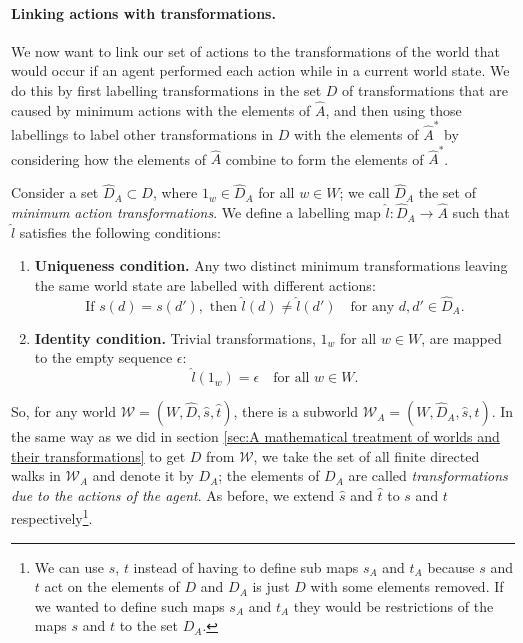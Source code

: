 \paragraph{Linking actions with transformations.}
We now want to link our set of actions to the transformations of the world that would occur if an agent performed each action while in a current world state.
We do this by first labelling transformations in the set $D$ of transformations that are caused by minimum actions with the elements of $\hat{A}$, and then using those labellings to label other transformations in $D$ with the elements of $\hat{A}^{\ast}$ by considering how the elements of $\hat{A}$ combine to form the elements of $\hat{A}^{\ast}$.

Consider a set $\hat{D}_{A} \subset D$, where $1_{w} \in \hat{D}_{A}$ for all $w \in W$; we call $\hat{D}_{A}$ the set of \textit{minimum action transformations}.
We define a labelling map $\hat{l}: \hat{D}_{A} \to \hat{A}$ such that $\hat{l}$ satisfies the following conditions:
\begin{enumerate}
	\item \textbf{Uniqueness condition.}
	      Any two distinct minimum transformations leaving the same world state are labelled with different actions:
	      \begin{equation}
		      \text{If } s(d) = s(d'), \text{ then } \hat{l}(d) \neq \hat{l}(d') \quad \text{for any } d, d' \in \hat{D}_{A}.
	      \end{equation}

	\item \textbf{Identity condition.}
	      Trivial transformations, $1_{w}$ for all $w \in W$, are mapped to the empty sequence $\epsilon$:
	      \begin{equation}
		      \hat{l}(1_{w}) = \epsilon \quad \text{for all } w \in W.
	      \end{equation}
\end{enumerate}

So, for any world $\mathscr{W} = (W, \hat{D}, \hat{s}, \hat{t})$, there is a subworld $\mathscr{W}_{A} = (W, \hat{D}_{A}, \hat{s}, \hat{t})$.
In the same way as we did in section \ref{sec:A mathematical treatment of worlds and their transformations} to get $D$ from $\mathscr{W}$, we take the set of all finite directed walks in $\mathscr{W}_{A}$ and denote it by $D_{A}$; the elements of $D_{A}$ are called \emph{transformations due to the actions of the agent}.
As before, we extend $\hat{s}$ and $\hat{t}$ to $s$ and $t$ respectively\footnote{
	We can use $s$, $t$ instead of having to define sub maps $s_{A}$ and $t_{A}$ because $s$ and $t$ act on the elements of $D$ and $D_{A}$ is just $D$ with some elements removed.
	If we wanted to define such maps $s_{A}$ and $t_{A}$ they would be restrictions of the maps $s$ and $t$ to the set $D_{A}$.
}.

